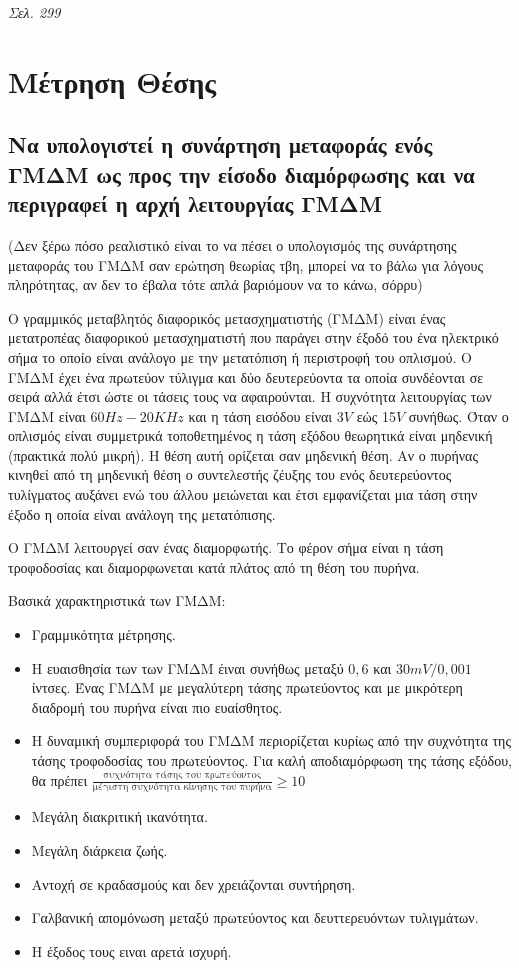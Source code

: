 \documentclass{article}
\begin{document}
\emph{Σελ. 299}

\section{Μέτρηση Θέσης}
\subsection{Να υπολογιστεί η συνάρτηση μεταφοράς ενός ΓΜΔΜ ως προς την είσοδο διαμόρφωσης και να περιγραφεί η αρχή λειτουργίας ΓΜΔΜ}
(Δεν ξέρω πόσο ρεαλιστικό είναι το να πέσει ο υπολογισμός της συνάρτησης μεταφοράς του ΓΜΔΜ σαν ερώτηση θεωρίας τβη, μπορεί να το βάλω για λόγους πληρότητας, αν δεν το έβαλα τότε
απλά βαριόμουν να το κάνω, σόρρυ)

Ο γραμμικός μεταβλητός διαφορικός μετασχηματιστής (ΓΜΔΜ) είναι ένας μετατροπέας διαφορικού μετασχηματιστή που παράγει στην έξοδό του ένα ηλεκτρικό σήμα το οποίο είναι ανάλογο με την 
μετατόπιση ή περιστροφή του οπλισμού. Ο ΓΜΔΜ έχει ένα πρωτεύον τύλιγμα και δύο δευτερεύοντα τα οποία συνδέονται σε σειρά αλλά έτσι ώστε οι τάσεις τους να αφαιρούνται. Η συχνότητα 
λειτουργίας των ΓΜΔΜ είναι $60Hz-20KHz$ και η τάση εισόδου είναι 3$V$ εώς 15$V$ συνήθως. Όταν ο οπλισμός είναι συμμετρικά τοποθετημένος η τάση εξόδου θεωρητικά είναι μηδενική (πρακτικά
πολύ μικρή). Η θέση αυτή ορίζεται σαν μηδενική θέση. Αν ο πυρήνας κινηθεί από τη μηδενική θέση ο συντελεστής ζέυξης του ενός δευτερεύοντος τυλίγματος αυξάνει ενώ του άλλου 
μειώνεται και έτσι εμφανίζεται μια τάση στην έξοδο η οποία είναι ανάλογη της μετατόπισης.

O ΓΜΔΜ λειτουργεί σαν ένας διαμορφωτής. Το φέρον σήμα είναι η τάση τροφοδοσίας και διαμορφωνεται κατά πλάτος από τη θέση του πυρήνα. 

Βασικά χαρακτηριστικά των ΓΜΔΜ: 

\begin{itemize}
    \item Γραμμικότητα μέτρησης.
    \item Η ευαισθησία των των ΓΜΔΜ έιναι συνήθως μεταξύ $0,6$ και $30mV/0,001$ ίντσες. Ένας ΓΜΔΜ με μεγαλύτερη τάσης πρωτεύοντος και με μικρότερη διαδρομή του πυρήνα είναι πιο ευαίσθητος.
    \item Η δυναμική συμπεριφορά του ΓΜΔΜ περιορίζεται κυρίως από την συχνότητα της τάσης τροφοδοσίας του πρωτεύοντος. Για καλή αποδιαμόρφωση της τάσης εξόδου, θα πρέπει
        \newline$\frac{\text{συχνότητα τάσης του πρωτεύοντος}}{\text{μέγιστη συχνότητα κίνησης του πυρήνα}}\geq 10$
    \item Μεγάλη διακριτική ικανότητα.
    \item Μεγάλη διάρκεια ζωής.
    \item Αντοχή σε κραδασμούς και δεν χρειάζονται συντήρηση.
    \item Γαλβανική απομόνωση μεταξύ πρωτεύοντος και δευττερευόντων τυλιγμάτων.
    \item Η έξοδος τους ειναι αρετά ισχυρή.
\end{itemize}
\end{document}
